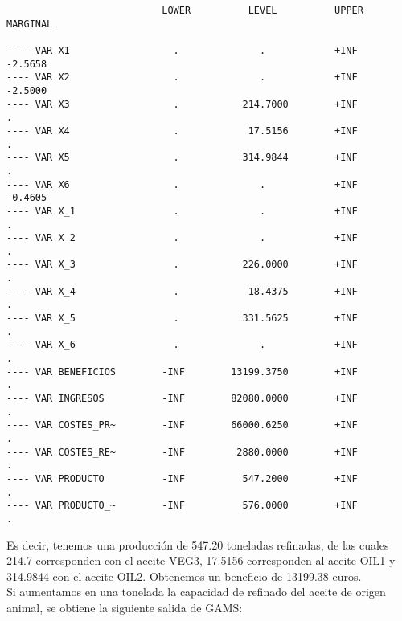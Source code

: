 \documentclass[12pt,a4paper,twoside,openright,titlepage,final]{article}
\begin{document}
\begin{verbatim}
                           LOWER          LEVEL          UPPER         MARGINAL

---- VAR X1                  .              .            +INF           -2.5658      
---- VAR X2                  .              .            +INF           -2.5000      
---- VAR X3                  .           214.7000        +INF             .          
---- VAR X4                  .            17.5156        +INF             .          
---- VAR X5                  .           314.9844        +INF             .          
---- VAR X6                  .              .            +INF           -0.4605      
---- VAR X_1                 .              .            +INF             .          
---- VAR X_2                 .              .            +INF             .          
---- VAR X_3                 .           226.0000        +INF             .          
---- VAR X_4                 .            18.4375        +INF             .          
---- VAR X_5                 .           331.5625        +INF             .          
---- VAR X_6                 .              .            +INF             .          
---- VAR BENEFICIOS        -INF        13199.3750        +INF             .          
---- VAR INGRESOS          -INF        82080.0000        +INF             .          
---- VAR COSTES_PR~        -INF        66000.6250        +INF             .          
---- VAR COSTES_RE~        -INF         2880.0000        +INF             .          
---- VAR PRODUCTO          -INF          547.2000        +INF             .          
---- VAR PRODUCTO_~        -INF          576.0000        +INF             .          
\end{verbatim}

Es decir, tenemos una producción de 547.20 toneladas refinadas, de las cuales 214.7 corresponden con el aceite VEG3, 17.5156 corresponden al aceite OIL1 y 314.9844 con el aceite OIL2. Obtenemos un beneficio de 13199.38 euros.\\

Si aumentamos en una tonelada la capacidad de refinado del aceite de origen animal, se obtiene la siguiente salida de GAMS:
\end{document}
